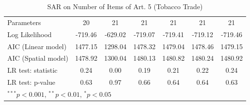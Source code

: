 \begin{table}[!h]
\begin{center}
\begin{tabular}{l c c c c c c }
Parameters              & 20           & 21           & 21           & 21           & 21           & 21           \\
Log Likelihood          & -719.46      & -629.02      & -719.07      & -719.41      & -719.12      & -719.46      \\
AIC (Linear model)      & 1477.15      & 1298.04      & 1478.32      & 1479.04      & 1478.46      & 1479.15      \\
AIC (Spatial model)     & 1478.92      & 1300.04      & 1480.13      & 1480.82      & 1480.24      & 1480.92      \\
LR test: statistic      & 0.24         & 0.00         & 0.19         & 0.21         & 0.22         & 0.24         \\
LR test: p-value        & 0.63         & 0.97         & 0.66         & 0.64         & 0.64         & 0.63         \\
\bottomrule
\multicolumn{7}{l}{\scriptsize{$^{***}p<0.001$, $^{**}p<0.01$, $^*p<0.05$}}
\end{tabular}
\caption{SAR on Number of Items of Art. 5 (Tobacco Trade)}
\label{table:coefficients}
\end{center}
\end{table}
